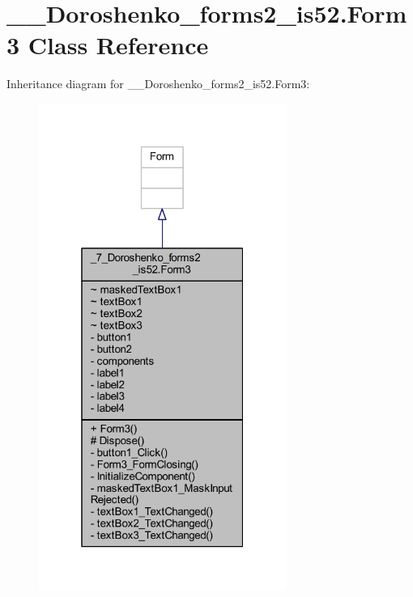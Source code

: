 \hypertarget{class__7___doroshenko__forms2__is52_1_1_form3}{}\section{\+\_\+\_\+\+Doroshenko\+\_\+forms2\+\_\+is52.\+Form3 Class Reference}
\label{class__7___doroshenko__forms2__is52_1_1_form3}


Inheritance diagram for \+\_\+\_\+\+Doroshenko\+\_\+forms2\+\_\+is52.\+Form3\+:
\nopagebreak
\begin{figure}[H]
\begin{center}
\leavevmode
\includegraphics[width=229pt]{class__7___doroshenko__forms2__is52_1_1_form3__inherit__graph}
\end{center}
\end{figure}


